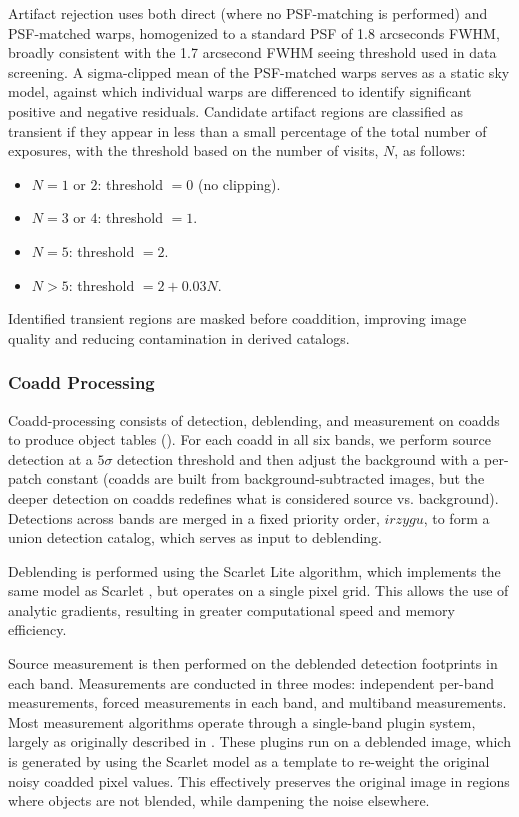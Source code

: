 Artifact rejection uses both direct (where no PSF-matching is performed) and PSF-matched warps, homogenized to a standard PSF of 1.8 arcseconds FWHM, broadly consistent with the 1.7 arcsecond FWHM \gls{seeing} threshold used in data screening.
A sigma-clipped mean of the \gls{PSF}-matched warps serves as a static sky model, against which individual warps are differenced to identify significant positive and negative residuals.
Candidate artifact regions are classified as \gls{transient} if they appear in less than a small percentage of the total number of exposures, with the threshold  based on the number of visits, $N$,  as follows:
\begin{itemize}
    \item $N=1$ or $2$: threshold $= 0$ (no clipping).
    \item $N=3$ or $4$: threshold $= 1$.
    \item $N=5$: threshold $= 2$.
    \item $N>5$: threshold $= 2+0.03N$.
\end{itemize}
Identified \gls{transient} regions are masked before coaddition, improving image quality and reducing contamination in derived catalogs.

\subsubsection{Coadd Processing}
\label{sssec:coadd_processing}
Coadd-processing consists of detection, \gls{deblend}ing, and  measurement on coadds to produce object tables ().
For each coadd in all six bands, we perform source detection at a $5\sigma$ detection threshold and then adjust the background with a per-patch constant (coadds are built from background-subtracted images, but the deeper detection on coadds redefines what is considered source vs. background).
Detections across bands are merged in a fixed priority order, $irzygu$, to form a union detection catalog, which serves as input to deblending.

Deblending is performed using the Scarlet Lite algorithm, which implements the same model as Scarlet \citep{2018A&C....24..129M}, but operates on a single pixel grid.
This allows the use of analytic gradients, resulting in greater computational speed and memory efficiency.

\gls{Source} measurement is then performed on the deblended detection footprints in each band.
Measurements are conducted in three modes: independent per-band measurements, forced measurements in each band, and multiband measurements.
Most measurement algorithms operate through a single-band plugin system, largely as originally described in \citet{2018PASJ...70S...5B}.
These plugins run on a deblended image, which is generated by using the Scarlet model as a template to re-weight the original noisy coadded pixel values.
This effectively preserves the original image in regions where objects are not blended, while dampening the noise elsewhere.

